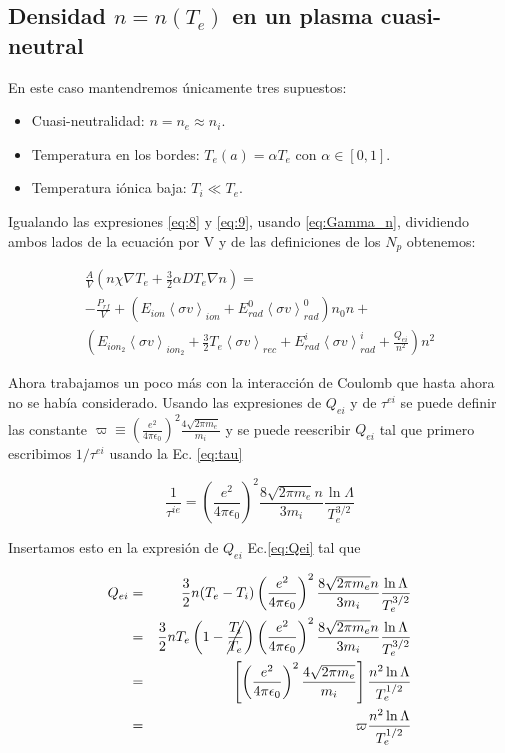 \subsection{Densidad $n = n(T_e)$ en un plasma cuasi-neutral}

  En este caso mantendremos \'unicamente tres supuestos:

  \begin{itemize}
    \item Cuasi-neutralidad: $n = n_e \approx n_i$.
    \item Temperatura en los bordes: $T_e(a) = \alpha T_e$ con $\alpha \in [0,1]$.
    \item Temperatura i\'onica baja: $T_i \ll T_e$.
  \end{itemize}

  Igualando las expresiones \eqref{eq:8} y \eqref{eq:9}, usando \eqref{eq:Gamma_n}, dividiendo ambos lados de la ecuaci\'on por V y de las definiciones de los $N_p$ obtenemos:

  \begin{eqnarray*}
  \frac{A}{V}(n\chi\nabla T_e + \frac{3}{2}\alpha D T_e \nabla n) = \\
  -\frac{P_{rf}}{V} + (E_{ion}\left<\sigma v\right>_{ion} + E_{rad}^0\left<\sigma v\right>_{rad}^0)n_0 n + \\ \left(E_{ion_2}\left<\sigma v\right>_{ion_2} + \frac{3}{2}T_e\left<\sigma v\right>_{rec} + E_{rad}^i\left<\sigma v\right>_{rad}^i + \frac{Q_{ei}}{n^2}\right)n^2
\end{eqnarray*}

Ahora trabajamos un poco m\'as con la interacci\'on de Coulomb que hasta ahora no se hab\'ia considerado. Usando las expresiones de $Q_{ei}$ y de $\tau^{ei}$ se puede definir las constante $\varpi \equiv \left(\frac{e^2}{4\pi\epsilon_0}\right)^2\frac{4\sqrt{2\pi m_e}}{m_i}$ y se puede reescribir $Q_{ei}$ tal que primero escribimos $1 / \tau^{ei}$ usando la Ec. \eqref{eq:tau}

  \begin{equation*}
    \frac{1}{\tau^{ie}} = \left(\frac{e^2}{4\pi\epsilon_0}\right)^2\frac{8\sqrt{2\pi m_e}n}{3 m_i}\frac{\ln{\Lambda}}{T_e^{3/2}}
  \end{equation*} 

  Insertamos esto en la expresi\'on de $Q_{ei}$ Ec.\eqref{eq:Qei} tal que 

  \begin{eqnarray}
    Q_{ei} &=& \frac{3}{2}n(T_e - T_i) \left(\frac{e^2}{4\pi\epsilon_0}\right)^2\frac{8\sqrt{2\pi m_e}n}{3 m_i}\frac{\ln{\Lambda}}{T_e^{3/2}} \nonumber \\
           &=& \frac{3}{2}nT_e\left(1 - \cancel{\frac{T_i}{T_e}}\right) \left(\frac{e^2}{4\pi\epsilon_0}\right)^2\frac{8\sqrt{2\pi m_e}n}{3 m_i}\frac{\ln{\Lambda}}{T_e^{3/2}} \nonumber \\
           &=& \left[\left(\frac{e^2}{4\pi\epsilon_0}\right)^2\frac{4\sqrt{2\pi m_e}}{m_i}\right]\frac{n^2\ln{\Lambda}}{T_e^{1/2}} \nonumber \\
           &=& \varpi\frac{n^2\ln{\Lambda}}{T_e^{1/2}}
  \end{eqnarray}

